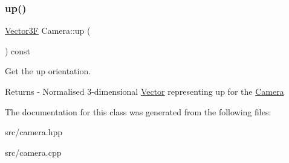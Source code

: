\subsubsection{\texorpdfstring{up()}{up()}}
{\footnotesize\ttfamily \mbox{\hyperlink{class_vector3}{Vector3F}} Camera\+::up (\begin{DoxyParamCaption}{ }\end{DoxyParamCaption}) const}

Get the up orientation. \begin{DoxyReturn}{Returns}
-\/ Normalised 3-\/dimensional \mbox{\hyperlink{class_vector}{Vector}} representing \textquotesingle{}up\textquotesingle{} for the \mbox{\hyperlink{class_camera}{Camera}} 
\end{DoxyReturn}


The documentation for this class was generated from the following files\+:\begin{DoxyCompactItemize}
\item 
src/camera.\+hpp\item 
src/camera.\+cpp\end{DoxyCompactItemize}
